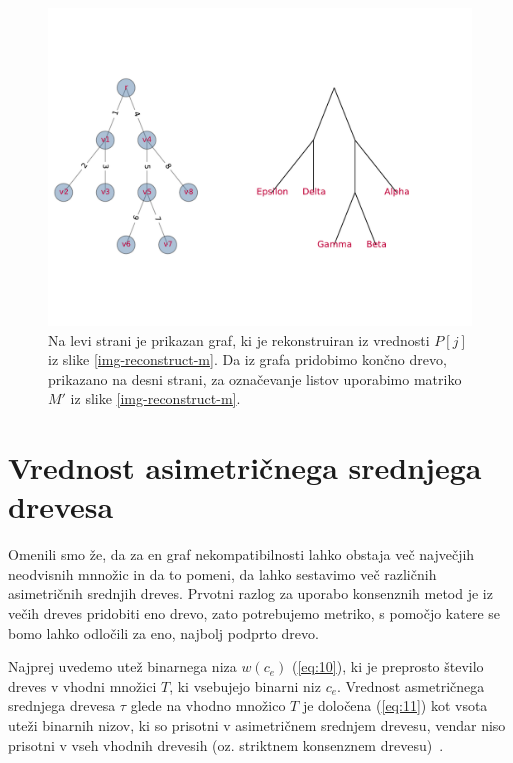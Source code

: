 \documentclass[a4paper, 12pt]{book}
\begin{document}
\begin{figure}
	\begin{center}
		\includegraphics[scale=0.74, clip=true, trim=0 3cm 3cm 3cm]{gfx/tree_reconstruct_1.pdf}
	\end{center}
	\caption{Na levi strani je prikazan graf, ki je rekonstruiran iz vrednosti $P[j]$ iz slike \ref{img-reconstruct-m}. Da iz grafa pridobimo končno drevo, prikazano na desni strani, za označevanje listov uporabimo matriko $M'$ iz slike \ref{img-reconstruct-m}.}
	\label{img-reconstruct-1}
\end{figure}

\section{Vrednost asimetričnega srednjega drevesa}
Omenili smo že, da za en graf nekompatibilnosti lahko obstaja več največjih neodvisnih mnnožic in da to pomeni, da lahko sestavimo več različnih asimetričnih srednjih dreves. Prvotni razlog za uporabo konsenznih metod je iz večih dreves pridobiti eno drevo, zato potrebujemo metriko, s pomočjo katere se bomo lahko odločili za eno, najbolj podprto drevo.  

Najprej uvedemo utež binarnega niza $w(c_e)$ (\ref{eq:10}), ki je preprosto število dreves v vhodni množici $T$, ki vsebujejo binarni niz $c_e$. Vrednost asmetričnega srednjega drevesa $\tau$ glede na vhodno množico $T$ je določena (\ref{eq:11}) kot vsota uteži binarnih nizov, ki so prisotni v asimetričnem srednjem drevesu, vendar niso prisotni v vseh vhodnih drevesih (oz. striktnem konsenznem drevesu)~\cite{pw}.
\end{document}
